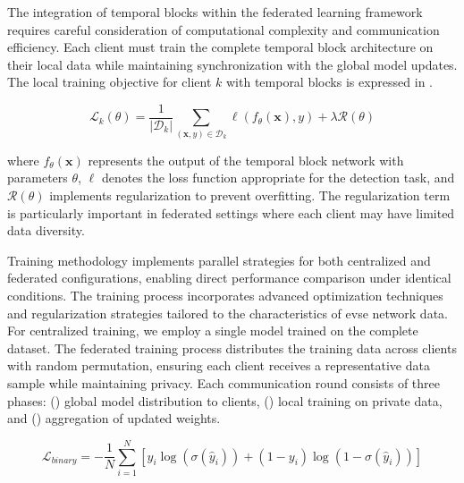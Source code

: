 The integration of temporal blocks within the federated learning framework requires careful consideration of computational complexity and communication efficiency. Each client must train the complete temporal block architecture on their local data while maintaining synchronization with the global model updates. The local training objective for client $k$ with temporal blocks is expressed in .

\begin{equation}
	\label{equation:local-objective}
	\mathcal{L}_k(\theta) = \frac{1}{|\mathcal{D}_k|} \sum_{(\mathbf{x}, y) \in \mathcal{D}_k} \ell(f_{\theta}(\mathbf{x}), y) + \lambda \mathcal{R}(\theta)
\end{equation}

where $f_{\theta}(\mathbf{x})$ represents the output of the temporal block network with parameters $\theta$, $\ell$ denotes the loss function appropriate for the detection task, and $\mathcal{R}(\theta)$ implements regularization to prevent overfitting. The regularization term is particularly important in federated settings where each client may have limited data diversity.

Training methodology implements parallel strategies for both centralized and federated configurations, enabling direct performance comparison under identical conditions. The training process incorporates advanced optimization techniques and regularization strategies tailored to the characteristics of \gls{evse} network data. For centralized training, we employ a single model trained on the complete dataset. The federated training process distributes the training data across clients with random permutation, ensuring each client receives a representative data sample while maintaining privacy. Each communication round consists of three phases: () global model distribution to clients, () local training on private data, and () aggregation of updated weights. 

\begin{equation}
	\label{equation:binary-loss}
	\mathcal{L}_{binary} = -\frac{1}{N}\sum_{i=1}^{N}[y_i\log(\sigma(\hat{y}_i)) + (1-y_i)\log(1-\sigma(\hat{y}_i))]
\end{equation}

